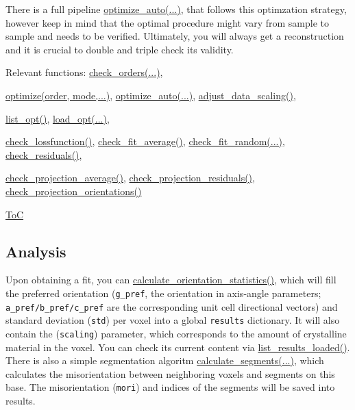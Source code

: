 There is a full pipeline \hyperref[fun:optimizeauto]{optimize\_auto(...)}, that follows 
this optimzation strategy, however keep in mind that
the optimal procedure might vary from sample to sample and needs to be verified. 
Ultimately, you will always get a reconstruction
and it is crucial to double and triple check its validity. 

Relevant functions:
\hyperref[fun:checkorders]{check\_orders(...)},

\hyperref[fun:optimize]{optimize(order, mode,...)},
\hyperref[fun:optimizeauto]{optimize\_auto(...)},
\hyperref[fun:adjustdatascaling]{adjust\_data\_scaling()},

\hyperref[fun:listopt]{list\_opt()},
\hyperref[fun:loadopt]{load\_opt(...)},

\hyperref[fun:checklossfunction]{check\_lossfunction()},
\hyperref[fun:checkfitaverage]{check\_fit\_average()},
\hyperref[fun:checkfitrandom]{check\_fit\_random(...)},
\hyperref[fun:checkresiduals]{check\_residuals()},

\hyperref[fun:checkprojectionsaverage]{check\_projection\_average()},
\hyperref[fun:checkprojectionsresiduals]{check\_projection\_residuals()},
\hyperref[fun:checkprojectionsorientations]{check\_projection\_orientations()}

\begin{flushright}
    \hyperref[toc]{ToC}
\end{flushright}

\subsection{Analysis}
Upon obtaining a fit, you can \hyperref[fun:calculateorientationstatistics]{calculate\_orientation\_statistics()},
which will fill the preferred orientation (\texttt{g\_pref}, the orientation in axis-angle parameters; 
\texttt{a\_pref/b\_pref/c\_pref} are the corresponding unit cell directional vectors)
and standard deviation (\texttt{std}) per voxel into a global \texttt{results} dictionary.
It will also contain the (\texttt{scaling}) parameter, which corresponds to the amount of crystalline material
in the voxel.
You can check its current content via \hyperref[fun:listresultsloaded]{list\_results\_loaded()}.
There is also a simple segmentation algoritm \hyperref[fun:calculatesegments]{calculate\_segments(...)},
which calculates the misorientation between neighboring voxels
and segments on this base. The misorientation (\texttt{mori}) and indices of the segments will be saved
into results.

